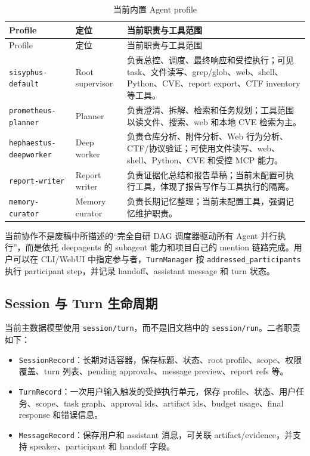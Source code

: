 \documentclass[UTF8,zihao=-4,a4paper,fontset=none]{ctexart}
\newcommand{\code}[1]{\texttt{\footnotesize #1}}
\begin{document}
\begin{longtable}{L{0.30\textwidth}L{0.22\textwidth}L{0.38\textwidth}}
\caption{当前内置 Agent profile}\label{tab:profiles}\\
\toprule
Profile & 定位 & 当前职责与工具范围 \\
\midrule
\endfirsthead
\toprule
Profile & 定位 & 当前职责与工具范围 \\
\midrule
\endhead
\code{sisyphus-default} & Root supervisor & 负责总控、调度、最终响应和受控执行；可见 task、文件读写、grep/glob、web、shell、Python、CVE、report export、CTF inventory 等工具。 \\
\code{prometheus-planner} & Planner & 负责澄清、拆解、检索和任务规划；工具范围以读文件、搜索、web 和本地 CVE 检索为主。 \\
\code{hephaestus-deepworker} & Deep worker & 负责仓库分析、附件分析、Web 行为分析、CTF/协议验证；可使用文件读写、web、shell、Python、CVE 和受控 MCP 能力。 \\
\code{report-writer} & Report writer & 负责证据化总结和报告草稿；当前未配置可执行工具，体现了报告写作与工具执行的隔离。 \\
\code{memory-curator} & Memory curator & 负责长期记忆整理；当前未配置工具，强调记忆维护职责。 \\
\bottomrule
\end{longtable}

当前协作不是废稿中所描述的“完全自研 DAG 调度器驱动所有 Agent 并行执行”，而是依托 deepagents 的 subagent 能力和项目自己的 mention 链路完成。用户可以在 CLI/WebUI 中指定参与者，\code{TurnManager} 按 \code{addressed\_participants} 执行 participant step，并记录 handoff、assistant message 和 turn 状态。

\subsection{Session 与 Turn 生命周期}

当前主数据模型使用 \code{session/turn}，而不是旧文档中的 \code{session/run}。二者职责如下：

\begin{itemize}
  \item \code{SessionRecord}：长期对话容器，保存标题、状态、root profile、scope、权限覆盖、turn 列表、pending approvals、message preview、report refs 等。
  \item \code{TurnRecord}：一次用户输入触发的受控执行单元，保存 profile、状态、用户任务、scope、task graph、approval ids、artifact ids、budget usage、final response 和错误信息。
  \item \code{MessageRecord}：保存用户和 assistant 消息，可关联 artifact/evidence，并支持 speaker、participant 和 handoff 字段。
\end{itemize}
\end{document}
